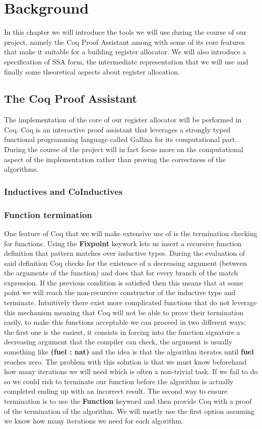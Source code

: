 \chapter{Background}
\label{cha:background}
In this chapter we will introduce the tools we will use during the course of our project, namely the Coq Proof Assistant among with some of its core features that make it suitable for a building register allocator. We will also introduce a specification of SSA form, the intermediate representation that we will use and finally some theoretical aspects about register allocation.

\section{The Coq Proof Assistant}
The implementation of the core of our register allocator will be performed in Coq. Coq is an interactive proof assistant that leverages a strongly typed functional programming language called Gallina for its computational part. 
During the course of the project will in fact focus more on the computational aspect of the implementation rather than proving the correctness of the algorithms.

\subsection{Inductives and CoInductives}
\label{subsec:ind-coind}

\subsection{Function termination}
One feature of Coq that we will make extensive use of is the termination checking for functions. Using the \textbf{Fixpoint} keywork lets us insert a recursive function definition that pattern matches over inductive types.
During the evaluation of said definition Coq checks for the existence of a decreasing argument (between the arguments of the function) and does that for every branch of the match expression. If the previous condition is satisfied then this means that at some point we will reach the non-recursive constructor of the inductive type and terminate.
Intuitively there exist more complicated functions that do not leverage this mechanism meaning that Coq will not be able to prove their termination easily, to make this functions acceptable we can proceed in two different ways:
the first one is the easiest, it consists in forcing into the function signature a decreasing argument that the compiler can check, the argument is usually something like \textbf{(fuel : nat)} and the idea is that the algorithm iterates until \textbf{fuel} reaches zero. The problem with this solution is that we must know beforehand how many iterations we will need which is often a non-trivial task. If we fail to do so we could risk to terminate our function before the algorithm is actually completed ending up with an incorrect result.
The second way to ensure termination is to use the \textbf{Function} keyword and then provide Coq with a proof of the termination of the algorithm.
We will mostly use the first option assuming we know how many iterations we need for each algorithm.

